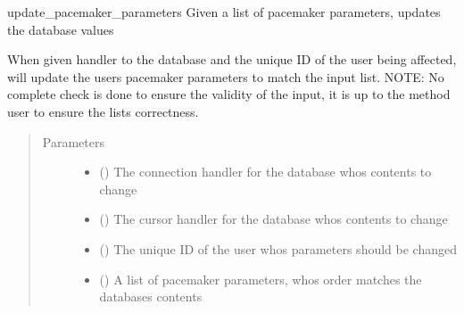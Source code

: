 \documentclass[letterpaper,10pt,english]{sphinxmanual}
\begin{document}

\begin{fulllineitems}
\label{\detokenize{flaskapp.data:flaskapp.data.database.update_pacemaker_parameters}}
update\_pacemaker\_parameters Given a list of pacemaker parameters, updates the database values

When given handler to the database and the unique ID of the user being affected, will update the
users pacemaker parameters to match the input list.
NOTE: No complete check is done to ensure the validity of the input, it is up
to the method user to ensure the lists correctness.
\begin{quote}\begin{description}
\item[{Parameters}] \leavevmode\begin{itemize}
\item {} 
 () \textendash{} The connection handler for the database whos contents to change

\item {} 
 () \textendash{} The cursor handler for the database whos contents to change

\item {} 
 () \textendash{} The unique ID of the user whos parameters should be changed

\item {} 
 () \textendash{} A list of pacemaker parameters, whos order matches the databases contents

\end{itemize}

\end{description}\end{quote}

\end{fulllineitems}
\end{document}
